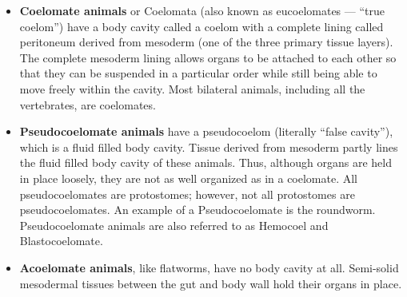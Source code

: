 \begin{itemize}
\item
  \textbf{Coelomate animals} or Coelomata (also known as eucoelomates
  --- ``true coelom'') have a body cavity called a coelom with a
  complete lining called peritoneum derived from mesoderm (one of the
  three primary tissue layers). The complete mesoderm lining allows
  organs to be attached to each other so that they can be suspended in a
  particular order while still being able to move freely within the
  cavity. Most bilateral animals, including all the vertebrates, are
  coelomates.
\item
  \textbf{Pseudocoelomate animals} have a pseudocoelom (literally
  ``false cavity''), which is a fluid filled body cavity. Tissue derived
  from mesoderm partly lines the fluid filled body cavity of these
  animals. Thus, although organs are held in place loosely, they are not
  as well organized as in a coelomate. All pseudocoelomates are
  protostomes; however, not all protostomes are pseudocoelomates. An
  example of a Pseudocoelomate is the roundworm. Pseudocoelomate animals
  are also referred to as Hemocoel and Blastocoelomate.
\item
  \textbf{Acoelomate animals}, like flatworms, have no body cavity at
  all. Semi-solid mesodermal tissues between the gut and body wall hold
  their organs in place.
\end{itemize}
